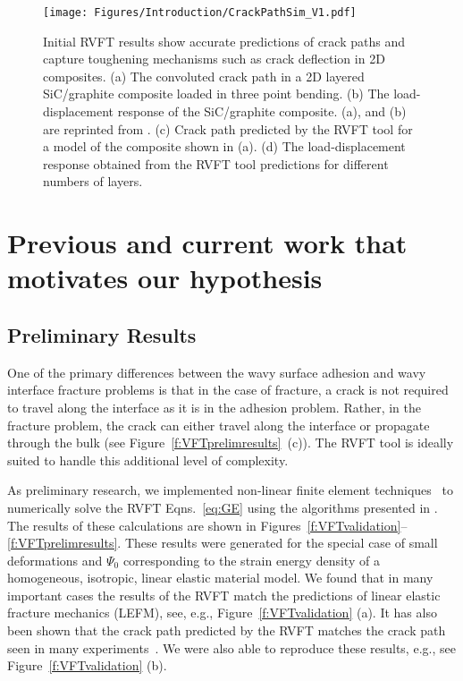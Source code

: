 \documentclass[10pt,letterpaper]{article}
\begin{document}
    \begin{figure}[h!]
      \centering
        \texttt{[image: Figures/Introduction/CrackPathSim\_V1.pdf]}
        \caption{ \footnotesize Initial RVFT results show accurate predictions of crack paths and capture toughening mechanisms such as crack deflection in 2D composites. (a) The convoluted crack path in a 2D layered SiC/graphite composite loaded in three point bending. (b) The load-displacement response of the SiC/graphite composite. (a), and (b) are reprinted from \cite{clegg1990simple}. (c) Crack path predicted by the RVFT tool for a model of the composite shown in (a). (d) The load-displacement response obtained from the RVFT tool predictions for different numbers of layers.
          }
        \label{f:sim}
    \end{figure}





\section{Previous and current work that motivates our hypothesis}
  \label{s:prevcurr}



  \subsection{Preliminary Results}
    \label{s:curr}
    One of the primary differences between the wavy surface adhesion and wavy interface fracture problems is that in the case of fracture, a crack is not required to travel along the interface as it is in the adhesion problem.
   Rather, in the fracture problem, the crack can either travel along the interface or propagate through the bulk (see Figure~\ref{f:VFTprelimresults}~(c)). The RVFT tool is ideally suited to handle this additional level of complexity.

    As preliminary research, we implemented non-linear finite element techniques~\cite{belytschko2013nonlinear} to numerically solve the RVFT Eqns.~\eqref{eq:GE} using the algorithms presented in \cite{borden2012phase}.
    The results of these calculations are shown in Figures~\ref{f:VFTvalidation}--\ref{f:VFTprelimresults}.
    These results were generated for the special case of small deformations and $\Psi_0$ corresponding to the strain energy density of a homogeneous, isotropic, linear elastic material model.
    We found that in many important cases the results of the RVFT match the predictions of linear elastic fracture mechanics (LEFM), see, e.g.,  Figure~\ref{f:VFTvalidation} (a).
    It has also been shown that the crack path predicted by the RVFT matches the crack path seen in many experiments~\cite{miehe2010phase,borden2012phase,dally2015phase}.
    We were also able to reproduce these results, e.g., see Figure~\ref{f:VFTvalidation} (b).
\end{document}
